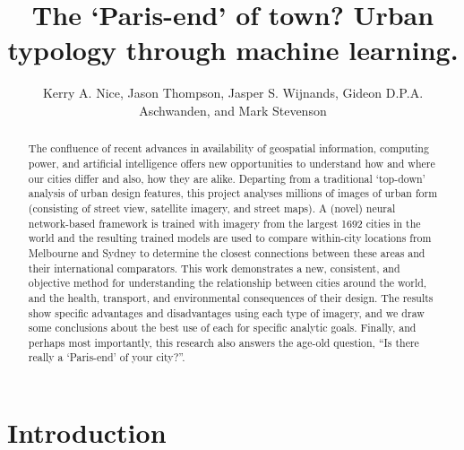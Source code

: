\documentclass[sageh,times]{sagej}
\begin{document}
\title{The `Paris-end' of town? Urban typology through machine learning.}

\author{Kerry A. Nice, Jason Thompson, Jasper S. Wijnands, Gideon D.P.A. Aschwanden, and Mark Stevenson}






\begin{abstract}

The confluence of recent advances in availability of geospatial information, computing power, and artificial intelligence offers new opportunities to understand how and where our cities differ and also, how they are alike. Departing from a traditional `top-down' analysis of urban design features, this project analyses millions of images of urban form (consisting of street view, satellite imagery, and street maps). A (novel) neural network-based framework is trained with imagery from the largest 1692 cities in the world and the resulting trained models are used to compare within-city locations from Melbourne and Sydney to determine the closest connections between these areas and their international comparators. This work demonstrates a new, consistent, and objective method for understanding the relationship between cities around the world, and the health, transport, and environmental consequences of their design. The results show specific advantages and disadvantages using each type of imagery, and we draw some conclusions about the best use of each for specific analytic goals. Finally, and perhaps most importantly, this research also answers the age-old question, ``Is there really a `Paris-end' of your city?''.
\end{abstract}


\maketitle


\section{Introduction}\label{sec:introduction}
\end{document}
